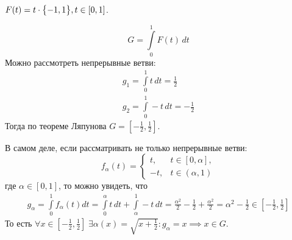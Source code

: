 \begin{exmp}
    $F(t) = t \cdot \bigl\{ -1, 1 \bigr\},  t \in [0, 1]$.

    \begin{equation*}
        G = \int\limits_{0}^{1} F(t) \, dt
    \end{equation*}
    Можно рассмотреть непрерывные ветви:
    \begin{gather*}
        g_1 = \int\limits_{0}^{1} t \, dt = \frac{1}{2} \\
        g_2 = \int\limits_{0}^{1} -t \, dt = -\frac{1}{2}
    \end{gather*}
    Тогда по теореме Ляпунова $G = [-\frac{1}{2}, \frac{1}{2}]$.

    В самом деле, если рассматривать не только непрерывные ветви:
    \begin{equation*}
        f_{\alpha}(t) = \begin{cases}
            t, & t \in [0, \alpha], \\
            -t, & t \in (\alpha, 1)
        \end{cases}
    \end{equation*}
    где $\alpha \in [0, 1]$, то можно увидеть, что
    \begin{multline*}
        g_\alpha = \int\limits_0^1 f_\alpha(t) dt = \int\limits_0^\alpha t \, dt + \int\limits_\alpha^1 -t \, dt = 
        \frac{\alpha^2}{2} - \frac{1}{2} + \frac{\alpha^2}{2} = \alpha^2 - \frac{1}{2} \in \left[-\frac{1}{2}, \frac{1}{2}\right]
    \end{multline*}
    То есть $\forall x \in \left[-\frac{1}{2}, \frac{1}{2}\right] \; \exists \alpha(x) = \sqrt{x + \frac{1}{2}}\colon g_\alpha = x \implies x \in G$.
\end{exmp}